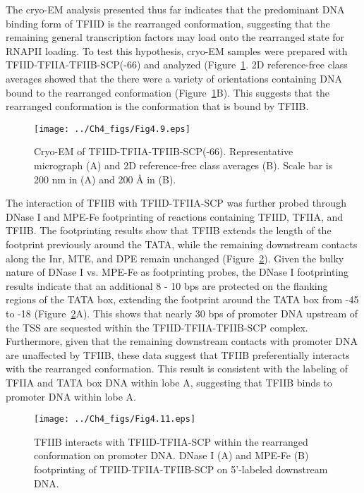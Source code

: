 The cryo-EM analysis presented thus far indicates that the predominant DNA binding form of TFIID is the rearranged conformation, suggesting that the remaining general transcription factors may load onto the rearranged state for RNAPII loading. To test this hypothesis, cryo-EM samples were prepared with TFIID-TFIIA-TFIIB-SCP(-66) and analyzed (Figure~\ref{fig:Fig4.9}. 2D reference-free class averages showed that the there were a variety of orientations containing DNA bound to the rearranged conformation (Figure~\ref{fig:Fig4.9}B). This suggests that the rearranged conformation is the conformation that is bound by TFIIB. \\
\begin{figure}
\centering
\texttt{[image: ../Ch4\_figs/Fig4.9.eps]}
\caption[Cryo-EM of TFIID-TFIIA-TFIIB-SCP(-66)]{Cryo-EM of TFIID-TFIIA-TFIIB-SCP(-66). Representative micrograph (A) and 2D reference-free class averages (B).  Scale bar is 200 nm in (A) and 200 Å in (B).}
\label{fig:Fig4.9}
\end{figure}
\indent The interaction of TFIIB with TFIID-TFIIA-SCP was further probed through DNase I and MPE-Fe footprinting of reactions containing TFIID, TFIIA, and TFIIB. The footprinting results show that TFIIB extends the length of the footprint previously around the TATA, while the remaining downstream contacts along the Inr, MTE, and DPE remain unchanged (Figure~\ref{fig:Fig4.11}). Given the bulky nature of DNase I vs. MPE-Fe as footprinting probes, the DNase I footprinting results indicate that an additional 8 - 10 bps are protected on the flanking regions of the TATA box, extending the footprint around the TATA box from -45 to -18 (Figure~\ref{fig:Fig4.11}A). This shows that nearly 30 bps of promoter DNA upstream of the TSS are sequested within the TFIID-TFIIA-TFIIB-SCP complex. Furthermore, given that the remaining downstream contacts with promoter DNA are unaffected by TFIIB, these data suggest that TFIIB preferentially interacts with the rearranged conformation. This result is consistent with the labeling of TFIIA and TATA box DNA within lobe A, suggesting that TFIIB binds to promoter DNA within lobe A.\\
\begin{figure}
\centering
\texttt{[image: ../Ch4\_figs/Fig4.11.eps]}
\caption[TFIIB interacts with TFIID-TFIIA-SCP within the rearranged conformation on promoter DNA]{TFIIB interacts with TFIID-TFIIA-SCP within the rearranged conformation on promoter DNA. DNase I (A) and MPE-Fe (B) footprinting of TFIID-TFIIA-TFIIB-SCP on 5'-labeled downstream DNA. }
\label{fig:Fig4.11}
\end{figure}
